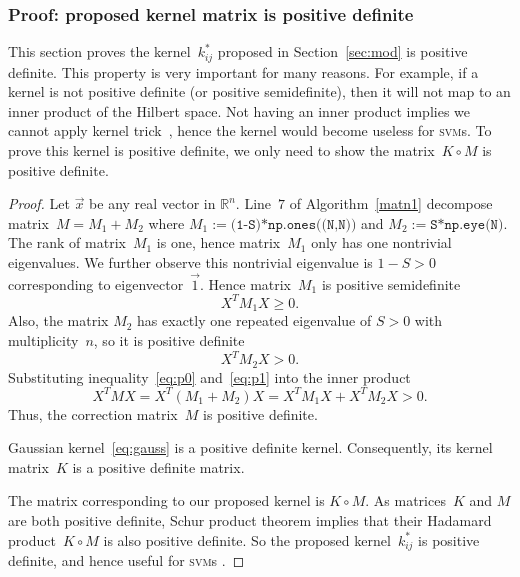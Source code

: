 \documentclass[12pt]{article} %
\newcommand{\svm}{\textsc{svm}}
\begin{document}
\subsubsection{Proof: proposed kernel matrix is positive definite} \label{sec:prove}
This section proves the kernel~$k^*_{ij}$ proposed in Section~\ref{sec:mod} is positive definite. This property is very important for many reasons. For example, if a kernel is not positive definite (or positive semidefinite), then it will not map to an inner product of the Hilbert space. Not having an inner product implies we cannot apply kernel trick~\citep{Theodoridis:2008:PRF:1457541}, hence the kernel would become useless for \svm s. To prove this kernel is positive definite, we only need to show the matrix~$K\circ M$ is positive definite.
\begin{proof}
Let $\vec x$ be any real vector in  $\mathbb{R}^n$. Line~$7$ of Algorithm~\ref{matn1} decompose matrix~$M=M_1+M_2$ where $M_1:=\texttt{(1-S)*np.ones((N,N))}$ and $M_2:=\texttt{S*np.eye(N)}$. The rank of  matrix~$M_1$ is one, hence matrix~$M_1$ only has one nontrivial eigenvalues. We further observe this nontrivial eigenvalue is $1-S>0$ corresponding to eigenvector~$\vec 1$. Hence matrix~$M_1$ is positive semidefinite
\begin{equation}\label{eq:p0}
    X^TM_1X\geq 0.
\end{equation}
Also, the matrix $M_2$ has exactly one repeated eigenvalue of $S>0$ with multiplicity~$n$, so it is positive definite
\begin{equation}\label{eq:p1}
    X^TM_2X>0.
\end{equation}
Substituting inequality~\eqref{eq:p0} and~\eqref{eq:p1} into the inner product
\begin{equation*}
    X^TMX=X^T(M_1+M_2)X=X^TM_1X+X^TM_2X>0.
\end{equation*}
Thus, the correction matrix~$M$ is positive definite.

Gaussian kernel~\eqref{eq:gauss} is a positive definite kernel. Consequently, its kernel matrix~$K$ is a positive definite matrix.

The matrix corresponding to our proposed kernel is $K\circ M$. As matrices~$K$ and $M$ are both positive definite, Schur product theorem \citep{Schur1911} implies that their Hadamard product~$K\circ M$ is also positive definite. So the proposed kernel~$k^*_{ij}$ is positive definite, and hence useful for \svm  s \citep{Theodoridis:2008:PRF:1457541}.
\end{proof}
\end{document}
